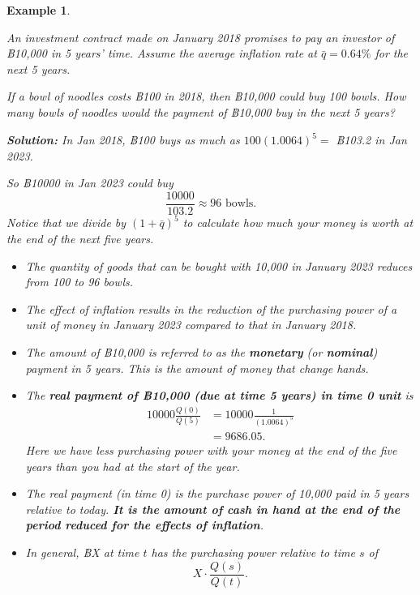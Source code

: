 \documentclass[landscape, 20pt]{extreport}
\theoremstyle{definition}
\theoremstyle{definition}
\newtheorem{example}{Example}[chapter]
\theoremstyle{definition}
\theoremstyle{definition}
\theoremstyle{remark}
\begin{document}
\newpage \begin{example}
\protect\hypertarget{exm:unlabeled-div-53}{}\label{exm:unlabeled-div-53}

\emph{An investment contract made on January 2018 promises
to pay an investor of ฿10,000 in 5 years' time. Assume the average
inflation rate at \(\bar{q} = 0.64\%\) for the next 5 years.}

\emph{If a bowl of noodles costs ฿100 in 2018, then ฿10,000 could buy 100
bowls. How many bowls of noodles would the payment of ฿10,000 buy in the
next 5 years?}

\emph{\textbf{Solution:} In Jan 2018, ฿100 buys as much as \(100 (1.0064)^5 =\)
฿103.2 in Jan 2023.}

\emph{So ฿10000 in Jan 2023 could buy
\[\frac{10000}{103.2} \approx 96 \text{ bowls}.\] Notice that we divide
by \((1 + \bar{q})^5\) to calculate how much your money is worth at the
end of the next five years.}

\begin{itemize}
\item
  \emph{The quantity of goods that can be bought with 10,000 in January
  2023 reduces from 100 to 96 bowls.}
\item
  \emph{The effect of inflation results in the reduction of the purchasing
  power of a unit of money in January 2023 compared to that in
  January 2018.}
\item
  \emph{The amount of ฿10,000 is referred to as the \textbf{monetary} (or
  \textbf{nominal}) payment in 5 years. This is the amount of money that
  change hands.}
\item
  \emph{The \textbf{real payment of ฿10,000 (due at time 5 years) in time 0
  unit} is \[\begin{aligned}
  10000 \frac{Q(0)}{Q(5)} &=  10000  \frac{1}{(1.0064)^5} \\
                           &=  9686.05.\end{aligned}\] Here we have
  less purchasing power with your money at the end of the five years
  than you had at the start of the year.}
\item
  \emph{The real payment (in time 0) is the purchase power of 10,000 paid
  in 5 years relative to today. \textbf{It is the amount of cash in hand at
  the end of the period reduced for the effects of inflation}.}
\item
  \emph{In general, ฿X at time \(t\) has the purchasing power relative to
  time \(s\) of \[X \cdot \frac{Q(s)}{Q(t)}.\]}
\end{itemize}

\end{example}
\end{document}
